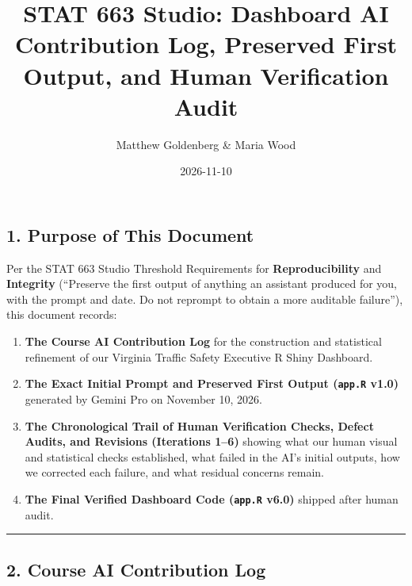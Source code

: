 \documentclass[
  letterpaper,
  DIV=11,
  numbers=noendperiod]{scrartcl}
\title{STAT 663 Studio: Dashboard AI Contribution Log, Preserved First
Output, and Human Verification Audit}
\author{Matthew Goldenberg \& Maria Wood}
\date{2026-11-10}
\providecommand{\tightlist}{%
  \setlength{\itemsep}{0pt}\setlength{\parskip}{0pt}}
\begin{document}
\maketitle


\subsection{1. Purpose of This Document}\label{purpose-of-this-document}

Per the STAT 663 Studio Threshold Requirements for
\textbf{Reproducibility} and \textbf{Integrity} (``Preserve the first
output of anything an assistant produced for you, with the prompt and
date. Do not reprompt to obtain a more auditable failure''), this
document records:

\begin{enumerate}
\def\labelenumi{\arabic{enumi}.}
\tightlist
\item
  \textbf{The Course AI Contribution Log} for the construction and
  statistical refinement of our Virginia Traffic Safety Executive R
  Shiny Dashboard.
\item
  \textbf{The Exact Initial Prompt and Preserved First Output
  (\texttt{app.R} v1.0)} generated by Gemini Pro on November 10, 2026.
\item
  \textbf{The Chronological Trail of Human Verification Checks, Defect
  Audits, and Revisions (Iterations 1--6)} showing what our human visual
  and statistical checks established, what failed in the AI's initial
  outputs, how we corrected each failure, and what residual concerns
  remain.
\item
  \textbf{The Final Verified Dashboard Code (\texttt{app.R} v6.0)}
  shipped after human audit.
\end{enumerate}

\begin{center}\rule{0.5\linewidth}{0.5pt}\end{center}

\subsection{2. Course AI Contribution
Log}\label{course-ai-contribution-log}
\end{document}
